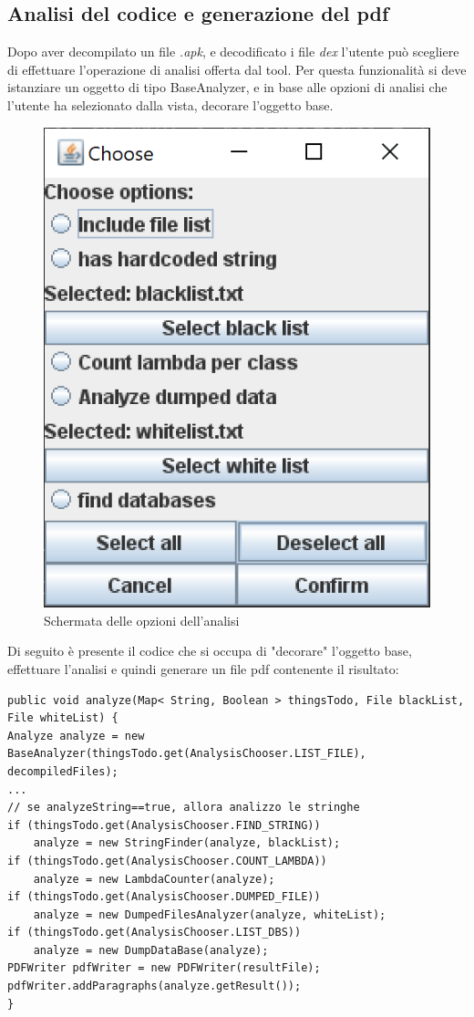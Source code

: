 \subsection{Analisi del codice e generazione del pdf}\label{subsec:analisi-del-codice-e-generazione-del-pdf}
Dopo aver decompilato un file \textit{.apk}, e decodificato i file \textit{dex} l'utente può scegliere di effettuare l'operazione di analisi offerta dal tool.
Per questa funzionalità si deve istanziare un oggetto di tipo BaseAnalyzer, e in base alle opzioni di analisi che l'utente ha selezionato dalla vista, decorare l'oggetto base.
\begin{figure}[H]
    \centering
    \includegraphics{./immagini/tool/analysis_chooser.png}
    \caption{Schermata delle opzioni dell'analisi}\label{fig:analysis_chooser}
\end{figure}
Di seguito è presente il codice che si occupa di "decorare" l’oggetto base, effettuare l’analisi e quindi generare un file pdf contenente il risultato:


\begin{lstlisting}[caption={Decorator},label={lst:analyze}]
public void analyze(Map< String, Boolean > thingsTodo, File blackList, File whiteList) {
Analyze analyze = new BaseAnalyzer(thingsTodo.get(AnalysisChooser.LIST_FILE), decompiledFiles);
...
// se analyzeString==true, allora analizzo le stringhe
if (thingsTodo.get(AnalysisChooser.FIND_STRING))
    analyze = new StringFinder(analyze, blackList);
if (thingsTodo.get(AnalysisChooser.COUNT_LAMBDA))
    analyze = new LambdaCounter(analyze);
if (thingsTodo.get(AnalysisChooser.DUMPED_FILE))
    analyze = new DumpedFilesAnalyzer(analyze, whiteList);
if (thingsTodo.get(AnalysisChooser.LIST_DBS))
    analyze = new DumpDataBase(analyze);
PDFWriter pdfWriter = new PDFWriter(resultFile);
pdfWriter.addParagraphs(analyze.getResult());
}
\end{lstlisting}

